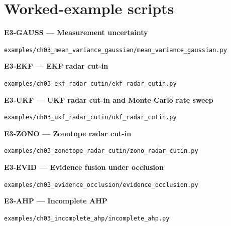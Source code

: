 \documentclass[graybox,envcountchap]{style/SNmono}
\newcommand{\repopath}[1]{\texttt{#1}}
\begin{document}
\section*{Worked-example scripts}

\par\medskip{}\label{code:E3-GAUSS}
\noindent\textbf{E3-GAUSS --- Measurement uncertainty}\par
\noindent\repopath{examples/\allowbreak ch03\_\allowbreak mean\_\allowbreak variance\_\allowbreak gaussian/\allowbreak mean\_\allowbreak variance\_\allowbreak gaussian.py}\par

\par\medskip{}\label{code:E3-EKF}
\noindent\textbf{E3-EKF --- EKF radar cut-in}\par
\noindent\repopath{examples/\allowbreak ch03\_\allowbreak ekf\_\allowbreak radar\_\allowbreak cutin/\allowbreak ekf\_\allowbreak radar\_\allowbreak cutin.py}\par

\par\medskip{}\label{code:E3-UKF}
\noindent\textbf{E3-UKF --- UKF radar cut-in and Monte Carlo rate sweep}\par
\noindent\repopath{examples/\allowbreak ch03\_\allowbreak ukf\_\allowbreak radar\_\allowbreak cutin/\allowbreak ukf\_\allowbreak radar\_\allowbreak cutin.py}\par

\par\medskip{}\label{code:E3-ZONO}
\noindent\textbf{E3-ZONO --- Zonotope radar cut-in}\par
\noindent\repopath{examples/\allowbreak ch03\_\allowbreak zonotope\_\allowbreak radar\_\allowbreak cutin/\allowbreak zono\_\allowbreak radar\_\allowbreak cutin.py}\par

\par\medskip{}\label{code:E3-EVID}
\noindent\textbf{E3-EVID --- Evidence fusion under occlusion}\par
\noindent\repopath{examples/\allowbreak ch03\_\allowbreak evidence\_\allowbreak occlusion/\allowbreak evidence\_\allowbreak occlusion.py}\par

\par\medskip{}\label{code:E3-AHP}
\noindent\textbf{E3-AHP --- Incomplete AHP}\par
\noindent\repopath{examples/\allowbreak ch03\_\allowbreak incomplete\_\allowbreak ahp/\allowbreak incomplete\_\allowbreak ahp.py}\par
\end{document}
